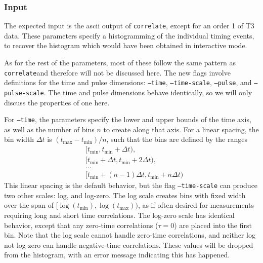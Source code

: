 \documentclass{article}
\newcommand{\correlate}{\texttt{correlate}}
\begin{document}
\subsubsection{Input}
The expected input is the ascii output of \correlate, except for an order 1 of T3 data. These parameters specify a histogramming of the individual timing events, to recover the histogram which would have been obtained in interactive mode.

As for the rest of the parameters, most of these follow the same pattern as \correlate and therefore will not be discussed here. The new flags involve definitions for the time and pulse dimensions: \texttt{--time}, \texttt{--time-scale}, \texttt{--pulse},  and \texttt{--pulse-scale}. The time and pulse dimensions behave identically, so we will only discuss the properties of one here.

For \texttt{--time}, the parameters specify the lower and upper bounds of the time axis, as well as the number of bins $n$ to create along that axis. For a linear spacing, the bin width $\Delta t$ is $(t_{\max}-t_{\min})/n$, such that the bins are defined by the ranges
\begin{equation}
\begin{aligned}
&[t_{\min},t_{\min}+\Delta t),\\
&[t_{\min}+\Delta t,t_{\min}+2\Delta t),\\
&\ldots\\
&[t_{\min}+(n-1)\Delta t,t_{\min}+n\Delta t)
\end{aligned}
\end{equation}
This linear spacing is the default behavior, but the flag \texttt{--time-scale} can produce two other scales: log, and log-zero. The log scale creates bins with fixed width over the span of $[\log(t_{\min}),\log(t_{\max}))$, as if often desired for measurements requiring long and short time correlations. The log-zero scale has identical behavior, except that any zero-time correlations ($\tau=0$) are placed into the first bin. Note that the log scale cannot handle zero-time correlations, and neither log not log-zero can handle negative-time correlations. These values will be dropped from the histogram, with an error message indicating this has happened.
\end{document}
